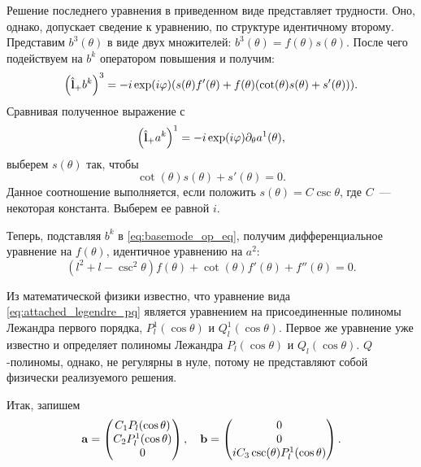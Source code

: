 \documentclass[12pt,a4paper]{article}
\begin{document}
        Решение последнего уравнения в приведенном виде представляет трудности. Оно, однако, допускает сведение к уравнению, по структуре идентичному второму. Представим $b^3(\theta)$ в виде двух множителей: $b^3(\theta) = f(\theta) s(\theta)$. После чего подействуем на $b^k$ оператором повышения и получим:
        \begin{equation}
            \qty(\hat{\mathbf{l}}_{+} b^k)^3 = - i \exp(i \varphi) \qty(
                s(\theta) f'(\theta) + f(\theta) \qty(\cot(\theta) s(\theta) + s'(\theta))
            ) .
        \end{equation}
        Сравнивая полученное выражение с
        \begin{equation}
            \qty(\hat{\mathbf{l}}_{+} a^k)^1 = - i \exp(i \varphi) \partial_\theta a^1(\theta) ,
        \end{equation}
        выберем $s(\theta)$ так, чтобы
        \begin{equation}
            \cot(\theta) s(\theta) + s'(\theta) = 0 .
        \end{equation}
        Данное соотношение выполняется, если положить $s(\theta) = C \csc\theta$, где $C$~--- некоторая константа. Выберем ее равной $i$.

        Теперь, подставляя $b^k$ в \autoref{eq:basemode_op_eq}, получим дифференциальное уравнение на $f(\theta)$, идентичное уравнению на $a^2$:
        \begin{equation}\label{eq:attached_legendre_pq}
            (l^2 + l - \csc^2\theta) f(\theta) + \cot(\theta) f'(\theta) + f''(\theta) = 0.
        \end{equation}

        Из математической физики известно, что уравнение вида \autoref{eq:attached_legendre_pq} является уравнением на присоединенные полиномы Лежандра первого порядка, $P_l^1(\cos\theta)$ и $Q_l^1(\cos\theta)$. Первое же уравнение уже известно и определяет полиномы Лежандра $P_l(\cos\theta)$ и $Q_l(\cos\theta)$. $Q$-полиномы, однако, не регулярны в нуле, потому не представляют собой физически реализуемого решения.

        Итак, запишем
        \begin{equation}
            \vb{a} = \begin{pmatrix}
                C_1 P_l(\cos\theta) \\
                C_2 P_l^1(\cos\theta) \\
                0
            \end{pmatrix} , \quad
            \vb{b} = \begin{pmatrix}
                0 \\
                0 \\
                i C_3 \csc(\theta) P_l^1(\cos\theta)
            \end{pmatrix} .
        \end{equation}
\end{document}
